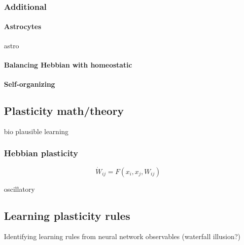 \documentclass{article}
\theoremstyle{definition} \newtheorem{definition}{Definition}
\theoremstyle{remark} \newtheorem{remark}{Remark}
\newcounter{ct}
\begin{document}
 
\subsubsection{Additional}
\paragraph{Astrocytes} 
astro\citep{depitta2016astrocytes}
\citep{koshkin2024astrocyte}

\paragraph{Balancing Hebbian with homeostatic}
\citep{zenke2017temporal}

\paragraph{Self-organizing}
\citep{federer2018self}
\citep{kohonen2012self, kohonen2013essentials}

\subsection{Plasticity math/theory}
\citep{gerstner2002mathematical}
\citep{berner2023adaptive}
\citep{clark2024theory}
\citep{tyulmankov2024computational}

bio plausible learning\citep{miconi2017biologically}

\subsubsection{Hebbian plasticity}
\citep{caporale2008spike}
\begin{equation}
\dot W_{ij} = F(x_i, x_j, W_{ij})
\end{equation}

oscillatory\citep{winder2009oscillatory}

\subsection{Learning plasticity rules} %
\citep{pereira2018attractor}

\citep{shervani2023meta}
\citep{bell2024discovering}
\citep{jordan2021plasticity}

Identifying learning rules from neural network observables \citep{nayebi2020learning} (waterfall illusion?)
\citep{kepple2022curriculum}
\citep{mcmahan2021learning}
\citep{ashwood2020inferring}
\end{document}
